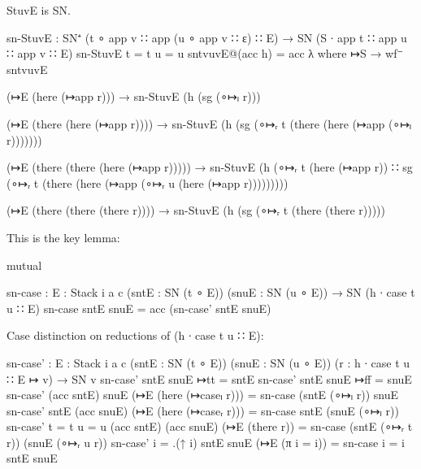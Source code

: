 StuvE is SN.

\begin{code}
sn-StuvE : SN⁺ (t ∘ app v ∷ app (u ∘ app v ∷ ε) ∷ E)
          → SN (S ∙ app t ∷ app u ∷ app v ∷ E)
sn-StuvE {t = t} {u = u} sntvuvE@(acc h) = acc λ where
  ↦S →
    wf⁻ sntvuvE

  (↦E (here (↦app r))) →
    sn-StuvE (h (sg (∘↦ₗ r)))

  (↦E (there (here (↦app r)))) →
    sn-StuvE (h (sg (∘↦ᵣ t (there (here (↦app (∘↦ₗ r)))))))

  (↦E (there (there (here (↦app r))))) →
    sn-StuvE (h (∘↦ᵣ t (here (↦app r)) ∷
                 sg (∘↦ᵣ t (there (here (↦app (∘↦ᵣ u (here (↦app r)))))))))

  (↦E (there (there (there r)))) →
    sn-StuvE (h (sg (∘↦ᵣ t (there (there r)))))
\end{code}

This is the key lemma:

\begin{code}
mutual

  sn-case : {E : Stack i a c} (sntE : SN (t ∘ E)) (snuE : SN (u ∘ E)) → SN (h ∙ case t u ∷ E)
  sn-case sntE snuE = acc (sn-case' sntE snuE)
\end{code}

  Case distinction on reductions of (h ∙ case t u ∷ E):

\begin{code}
  sn-case' : {E : Stack i a c}
            (sntE : SN (t ∘ E))
            (snuE : SN (u ∘ E))
            (r : h ∙ case t u ∷ E ↦ v) → SN v
  sn-case'  sntE snuE ↦tt = sntE
  sn-case'  sntE snuE ↦ff = snuE
  sn-case'  (acc sntE) snuE (↦E (here (↦caseₗ r)))   = sn-case (sntE (∘↦ₗ r)) snuE
  sn-case'  sntE (acc snuE) (↦E (here (↦caseᵣ r)))   = sn-case sntE (snuE (∘↦ₗ r))
  sn-case'  {t = t} {u = u}
            (acc sntE) (acc snuE) (↦E (there r))     = sn-case (sntE (∘↦ᵣ t r)) (snuE (∘↦ᵣ u r))
  sn-case'  {i = .(↑ i)} sntE snuE (↦E (π {i = i}))  = sn-case {i = i} sntE snuE
\end{code}


